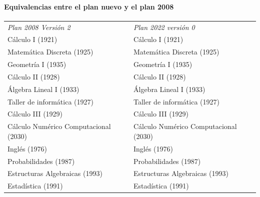 \documentclass[a4paper, 12pt]{article}
\begin{document}
\paragraph{Equivalencias entre el plan nuevo y el plan 2008} \fontsize{11pt}{11pt}\selectfont
\begin{center}
\begin{tabularx}{1\textwidth}{|>{\raggedright\arraybackslash}X |
>{\raggedright\arraybackslash}X |}
\hline
  \rowcolor[gray]{.9}
  \multicolumn{2}{|c|}{\textbf{Equivalencias}}\\\hline

   \emph{Plan 2008 Versión 2 }  &  \emph{
Plan 2022 versión 0}   \\
\hline


Cálculo I       (1921)               &Cálculo I    (1921)      \\   \hline

Matemática Discreta   (1925)          &Matemática Discreta (1925) \\ \hline

Geometría I        (1935)             & Geometría I (1935)   \\ \hline

Cálculo II         (1928)             & Cálculo II (1928)  \\ \hline

Álgebra Lineal I      (1933)          & Álgebra Lineal I  (1933)  \\ \hline

Taller de informática  (1927)        &Taller de informática (1927) \\ \hline

Cálculo III        (1929)             & Cálculo III (1929)  \\ \hline

Cálculo Numérico  Computacional (2030) &Cálculo Numérico Computacional (2030) 
\\ \hline

Inglés       (1976)            &    Inglés (1976) 
\\ \hline

Probabilidades  (1987)      &Probabilidades    (1987)      \\ \hline

Estructuras Algebraicas (1993)    & Estructuras Algebraicas (1993)  \\ \hline

Estadística     (1991)    &Estadística     (1991)        \\ \hline



\end{tabularx}
\end{center}
\end{document}
